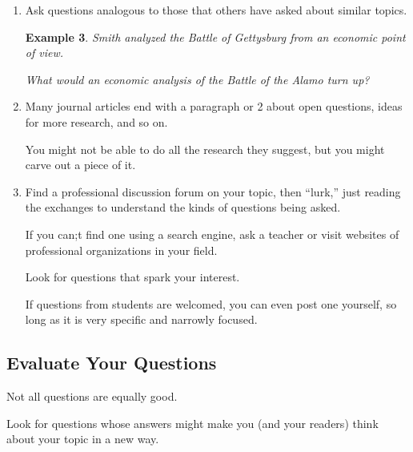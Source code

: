 \documentclass[oneside]{book}
\numberwithin{equation}{section}
\newtheorem{example}{Example}[section]
\begin{document}
\begin{enumerate}
\begin{example}
        Is the same anxiety responsible for similar developments in other European capitals?
    \end{example}
    You can also ask a question that supports the same claim with additional evidence.
    \begin{example}
        Elias supports his claim about masked balls entirely with published sources.
        
        It is also supported by evidence from unpublished sources e.g. letters and diaries?
    \end{example}
    \item Ask questions analogous to those that others have asked about similar topics.
    \begin{example}
        Smith analyzed the Battle of Gettysburg from an economic point of view.
        
        What would an economic analysis of the Battle of the Alamo turn up?
    \end{example}
    \item {}
    
    Many journal articles end with a paragraph or 2 about open questions, ideas for more research, and so on.
    
    You might not be able to do all the research they suggest, but you might carve out a piece of it.
    \item Find a professional discussion forum on your topic, then ``lurk,'' just reading the exchanges to understand the kinds of questions being asked.
    
    If you can;t find one using a search engine, ask a teacher or visit websites of professional organizations in your field.
    
    Look for questions that spark your interest.
    
    If questions from students are welcomed, you can even post one yourself, so long as it is very specific and narrowly focused.
\end{enumerate}

\subsection{Evaluate Your Questions}

Not all questions are equally good.

Look for questions whose answers might make you (and your readers) think about your topic in a new way.
\end{document}
